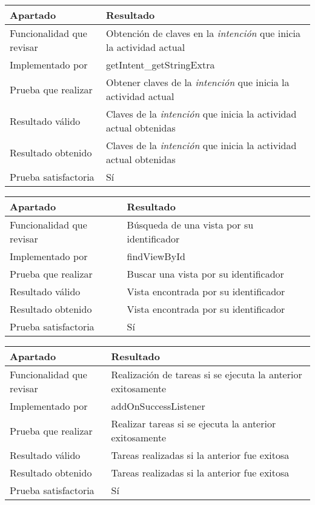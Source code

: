 \begin{center}
    \begin{tabulary}{0.8\textwidth}{L|L}
        \textbf{Apartado} & \textbf{Resultado} \\ \hline
        Funcionalidad que revisar & Obtención de claves en la \textit{intención} que inicia la actividad actual \\
        Implementado por & getIntent\_getStringExtra \\
        Prueba que realizar & Obtener claves de la \textit{intención} que inicia la actividad actual \\
        Resultado válido & Claves de la \textit{intención} que inicia la actividad actual obtenidas \\
        Resultado obtenido & Claves de la \textit{intención} que inicia la actividad actual obtenidas \\
        Prueba satisfactoria & Sí \\
    \end{tabulary}
\end{center}

\bigskip

\begin{center}
    \begin{tabulary}{0.8\textwidth}{L|L}
        \textbf{Apartado} & \textbf{Resultado} \\ \hline
        Funcionalidad que revisar & Búsqueda de una vista por su identificador \\
        Implementado por & findViewById \\
        Prueba que realizar & Buscar una vista por su identificador \\
        Resultado válido & Vista encontrada por su identificador \\
        Resultado obtenido & Vista encontrada por su identificador \\
        Prueba satisfactoria & Sí \\
    \end{tabulary}
\end{center}

\bigskip

\begin{center}
    \begin{tabulary}{0.8\textwidth}{L|L}
        \textbf{Apartado} & \textbf{Resultado} \\ \hline
        Funcionalidad que revisar & Realización de tareas si se ejecuta la anterior exitosamente \\
        Implementado por & addOnSuccessListener \\
        Prueba que realizar & Realizar tareas si se ejecuta la anterior exitosamente \\
        Resultado válido & Tareas realizadas si la anterior fue exitosa \\
        Resultado obtenido & Tareas realizadas si la anterior fue exitosa \\
        Prueba satisfactoria & Sí \\
    \end{tabulary}
\end{center}

